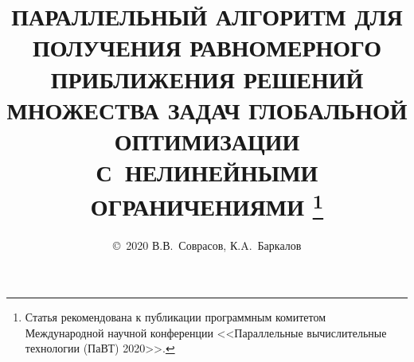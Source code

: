 \documentclass{cmi}
\begin{document}

\renewcommand*{\thefootnote}{\fnsymbol{footnote}} %

\title{ПАРАЛЛЕЛЬНЫЙ АЛГОРИТМ ДЛЯ ПОЛУЧЕНИЯ РАВНОМЕРНОГО ПРИБЛИЖЕНИЯ
РЕШЕНИЙ МНОЖЕСТВА ЗАДАЧ ГЛОБАЛЬНОЙ ОПТИМИЗАЦИИ С~НЕЛИНЕЙНЫМИ ОГРАНИЧЕНИЯМИ%
\footnote{Статья рекомендована к публикации программным комитетом Международной
научной конференции <<Параллельные вычислительные технологии (ПаВТ) 2020>>.}%
}

\author{\copyright~2020 В.В.~Соврасов, К.A.~Баркалов}



\address{Нижегородский государственный университет им. Н.И.~Лобачевского\\
  (603022 Нижний Новгород, пр.~Гагарина, д.~23, к.~2)}



\maketitle{}


\renewcommand*{\thefootnote}{\arabic{footnote}}
\setcounter{footnote}{0}
\end{document}
